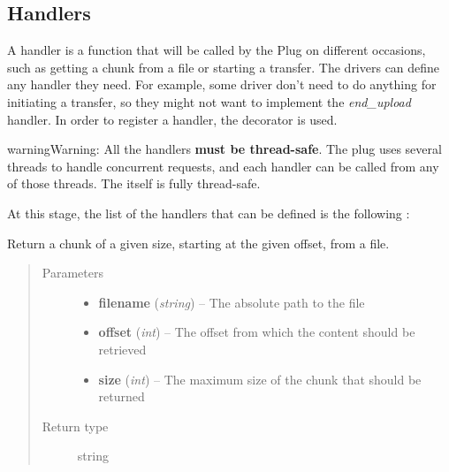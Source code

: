 \documentclass[letterpaper,10pt,english]{sphinxmanual}
\begin{document}
\subsection{Handlers}
\label{drivers:id1}\label{drivers:handlers}
A handler is a function that will be called by the Plug on different occasions, such as getting a chunk from a file or starting a transfer. The drivers can define any handler they need. For example, some driver don't need to do anything for initiating a transfer, so they might not want to implement the \emph{end\_upload} handler.
In order to register a handler, the {\hyperref[drivers:onitu.api.Plug.handler]{}} decorator is used.

\begin{notice}{warning}{Warning:}
All the handlers \textbf{must be thread-safe}. The plug uses several threads to handle concurrent requests, and each handler can be called from any of those threads. The {\hyperref[drivers:onitu.api.Plug]{}} itself is fully thread-safe.
\end{notice}

At this stage, the list of the handlers that can be defined is the following :

\begin{fulllineitems}
\label{drivers:get_chunk}
Return a chunk of a given size, starting at the given offset, from a file.
\begin{quote}\begin{description}
\item[{Parameters}] \leavevmode\begin{itemize}
\item {} 
\textbf{filename} (\emph{string}) -- The absolute path to the file

\item {} 
\textbf{offset} (\emph{int}) -- The offset from which the content should be retrieved

\item {} 
\textbf{size} (\emph{int}) -- The maximum size of the chunk that should be returned

\end{itemize}

\item[{Return type}] \leavevmode
string

\end{description}\end{quote}

\end{fulllineitems}
\end{document}
